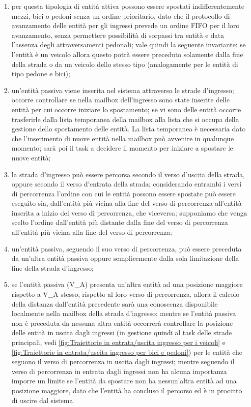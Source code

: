 \begin{enumerate}
\item per questa tipologia di entità attiva possono essere spostati
indifferentemente mezzi, bici o pedoni senza un ordine prioritario, dato che il protocollo di avanzamento delle entità per gli ingressi prevede un ordine
\ac{FIFO} per il loro avanzamento, senza permettere possibilità di sorpassi tra entità e data l'assenza degli attraversamenti pedonali; vale quindi la seguente invariante: se l'entità è un veicolo allora questo potrà essere preceduto solamente dalla fine della strada o da un veicolo dello stesso tipo (analogamente per le entità di tipo pedone e bici);
\item un'entità passiva viene inserita nel sistema attraverso le strade d'ingresso; occorre controllare se nella mailbox dell'ingresso sono state inserite delle entità per cui occorre iniziare lo spostamento; se vi sono delle entità occorre trasferirle dalla lista temporanea della mailbox alla lista che si occupa della gestione dello spostamento delle entità. La lista temporanea è necessaria dato che l'inserimento di nuove entità nella mailbox può avvenire in qualunque momento; sarà poi il task a decidere il momento per iniziare a spostare le nuove entità;
\item la strada d'ingresso può essere percorsa secondo il verso d'uscita della strada, oppure secondo il verso d'entrata della strada; considerando entrambi i versi di percorrenza l'ordine con cui le entità possono essere spostate può essere eseguito sia, dall'entità più vicina alla fine del verso di percorrenza all'entità inserita a inizio del verso di percorrenza, che viceversa; supponiamo che venga scelto l'ordine dall'entità più distante dalla fine del verso di percorrenza all'entità più vicina alla fine del verso di percorrenza;
\item un'entità passiva, seguendo il suo verso di percorrenza, può essere preceduta da un'altra entità passiva oppure semplicemente dalla sola limitazione della fine della strada d'ingresso;
\item se l'entità passiva (V\_A) presenta un'altra entità ad una posizione maggiore rispetto a V\_A stesso, rispetto al loro verso di percorrenza, allora il calcolo della distanza dall'entità precedente sarà una conoscenza disponibile localmente nella mailbox della strada d'ingresso; mentre se l'entità passiva non è preceduta da nessuna altra entità occorrerà controllare la posizione delle entità in uscita dagli ingressi (in gestione quindi al task delle strade principali, vedi \ref{fig:Traiettorie in entrata/uscita ingresso per i veicoli} e \ref{fig:Traiettorie in entrata/uscita ingresso per bici e pedoni}) per le entità che seguono il verso di percorrenza in uscita dagli ingressi; mentre seguendo il verso di percorrenza in entrata dagli ingressi non ha alcuna importanza imporre un limite se l'entità da spostare non ha nessun'altra entità ad una posizione maggiore, dato che l'entità ha concluso il percorso ed è in procinto di uscire dal sistema.

\end{enumerate}
